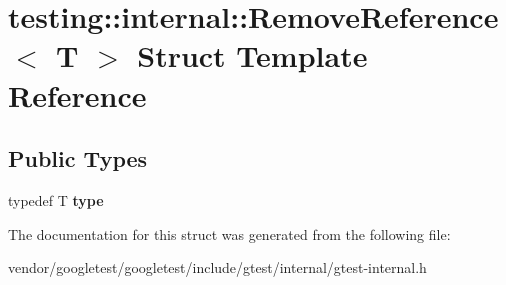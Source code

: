 \hypertarget{structtesting_1_1internal_1_1RemoveReference}{}\section{testing\+:\+:internal\+:\+:Remove\+Reference$<$ T $>$ Struct Template Reference}
\label{structtesting_1_1internal_1_1RemoveReference}
\subsection*{Public Types}
\begin{DoxyCompactItemize}
\item 
typedef T {\bfseries type}\hypertarget{structtesting_1_1internal_1_1RemoveReference_a9ca4f6499579225f7986b789ee4b2895}{}\label{structtesting_1_1internal_1_1RemoveReference_a9ca4f6499579225f7986b789ee4b2895}

\end{DoxyCompactItemize}


The documentation for this struct was generated from the following file\+:\begin{DoxyCompactItemize}
\item 
vendor/googletest/googletest/include/gtest/internal/gtest-\/internal.\+h\end{DoxyCompactItemize}
